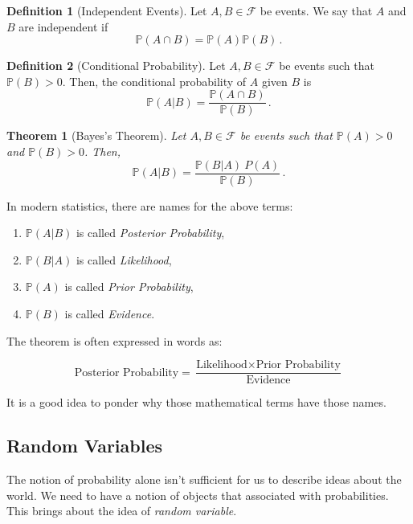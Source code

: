 \documentclass[
  openany]{book}
\newtheorem{theorem}{Theorem}[chapter]
\theoremstyle{definition}
\newtheorem{definition}{Definition}[chapter]
\theoremstyle{definition}
\theoremstyle{definition}
\theoremstyle{definition}
\theoremstyle{remark}
\begin{document}
\begin{definition}[Independent Events]
Let \(A, B \in \mathcal{F}\) be events. We say that \(A\) and \(B\) are independent
if
\[ \mathbb{P}(A \cap B) = \mathbb{P}(A) \mathbb{P}(B)  \,. \]
\end{definition}

\begin{definition}[Conditional Probability]
Let \(A, B \in \mathcal{F}\) be events such that \(\mathbb{P}(B) >0\). Then, the conditional probability of
\(A\) given \(B\) is
\[ \mathbb{P}(A \vert B) = \frac{\mathbb{P}(A \cap B)}{\mathbb{P}(B)} \,. \]
\end{definition}

\begin{theorem}[Bayes's Theorem]
Let \(A, B \in \mathcal{F}\) be events such that \(\mathbb{P}(A)>0\) and \(\mathbb{P}(B) >0\).
Then,
\[\mathbb{P}(A | B) = \frac{\mathbb{P}(B | A) \ P(A)}{\mathbb{P}(B)} \,.\]
\end{theorem}

In modern statistics, there are names for the above terms:

\begin{enumerate}
\def\labelenumi{\arabic{enumi}.}
\item
  \(\mathbb{P}(A | B)\) is called \emph{Posterior Probability},
\item
  \(\mathbb{P}(B | A)\) is called \emph{Likelihood},
\item
  \(\mathbb{P}(A)\) is called \emph{Prior Probability},
\item
  \(\mathbb{P}(B)\) is called \emph{Evidence}.
\end{enumerate}

The theorem is often expressed in words as:

\[ \text{Posterior Probability} = \frac{\text{Likelihood} \times \text{Prior Probability}}{\text{Evidence}} \]

It is a good idea to ponder why those mathematical terms have those names.

\subsection{Random Variables}\label{random-variables}

The notion of probability alone isn't sufficient for us to describe ideas about the world.
We need to have a notion of objects that associated with probabilities.
This brings about the idea of \emph{random variable}.
\end{document}
